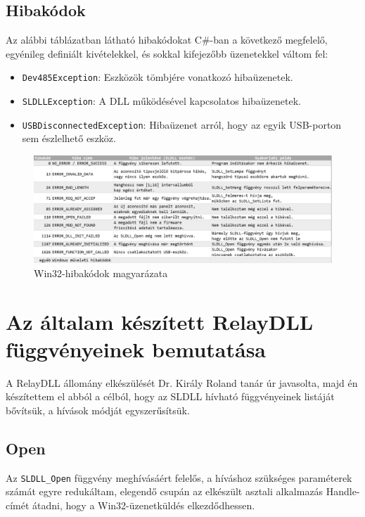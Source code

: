 \documentclass[tocnopagenum]{thesis-ekf}
\theoremstyle{definition}
\theoremstyle{remark}
\begin{document}
	\subsection{Hibakódok}
	Az alábbi táblázatban látható hibakódokat C\#-ban a következő megfelelő, egyénileg definiált kivételekkel, és sokkal kifejezőbb üzenetekkel váltom fel:
	\begin{itemize}
		\item \verb*|Dev485Exception|: Eszközök tömbjére vonatkozó hibaüzenetek.
		\item \verb*|SLDLLException|: A DLL működésével kapcsolatos hibaüzenetek.
		\item \verb*|USBDisconnectedException|: Hibaüzenet arról, hogy az egyik USB-porton sem észlelhető eszköz.
	\end{itemize}
	\begin{figure}[h!]
		\centering
		\hspace*{-0.5in}
		\includegraphics[scale=0.5]{images/errcodes.png}
		\caption[Hibakódok és magyarázataik]{Win32-hibakódok magyarázata}
		\label{fig:errcodes}
	\end{figure}
	\section{Az általam készített RelayDLL függvényeinek bemutatása}
	A RelayDLL állomány elkészülését Dr. Király Roland tanár úr javasolta, majd én készítettem el abból a célból, hogy az SLDLL hívható függvényeinek listáját bővítsük, a hívások módját egyszerűsítsük.
	
	\subsection{Open} Az \verb*|SLDLL_Open| függvény meghívásáért felelős, a híváshoz szükséges paraméterek számát egyre redukáltam, elegendő csupán az elkészült asztali alkalmazás Handle-címét átadni, hogy a Win32-üzenetküldés elkezdődhessen.
\end{document}
